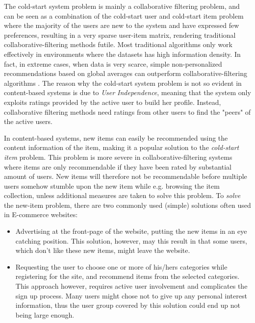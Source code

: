 The cold-start system problem is mainly a collaborative filtering problem, and
can be seen as a combination of the cold-start user and cold-start item problem
where the majority of the users are new to the system and have expressed few
preferences, resulting in a very sparse user-item matrix, rendering traditional
collaborative-filtering methods futile. Most traditional algorithms only work
effectively in environments where the datasets has high information density. In
fact, in extreme cases, when data is very scarce, simple non-personalized
recommendations based on global averages can outperform collaborative-filtering
algorithms \cite{Park2006}. The reason why the cold-start system problem is not
so evident in content-based systems is due to \emph{User Independence}, meaning
that the system only exploits ratings provided by the active user to build her
profile. Instead, collaborative filtering methods need ratings from other users
to find the "peers" of the active users.

In content-based systems, new items can easily be recommended using the content
information of the item, making it a popular solution to the \emph{cold-start
item} problem. This problem is more severe in collaborative-filtering systems
where items are only recommendable if they have been rated by substantial
amount of users. New items will therefore not be recommendable before multiple
users somehow stumble upon the new item while e.g. browsing the item
collection, unless additional measures are taken to solve this problem. To
\emph{solve} the new-item problem, there are two commonly used (simple)
solutions often used in E-commerce websites:

\begin{itemize}
\item Advertising at the front-page of the website, putting the new
items in an eye catching position. This solution, however, may this result in
that some users, which don't like these new items, might leave the website.

\item Requesting the user to choose one or more of his/hers categories while
registering for the site, and recommend items from the selected categories.
This approach however, requires active user involvement and complicates the
sign up process. Many users might chose not to give up any personal interest
information, thus the user group covered by this solution could end up not
being large enough.

\end{itemize}

